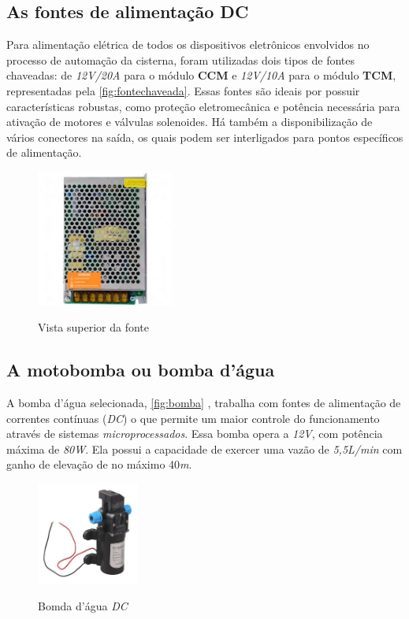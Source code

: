 \subsection{As fontes de alimentação DC}

Para alimentação elétrica de todos os dispositivos eletrônicos envolvidos no processo de automação da cisterna, foram utilizadas dois tipos de fontes chaveadas: de \textit{12V/20A} para o módulo \textbf{CCM} e \textit{12V/10A} para o módulo \textbf{TCM}, representadas pela \autoref{fig:fontechaveada}. Essas fontes são ideais por possuir características robustas, como proteção eletromecânica e potência necessária para ativação de motores e válvulas solenoides. Há também a disponibilização de vários conectores na saída, os quais podem ser interligados para pontos específicos de alimentação.

\begin{figure}[H]
	\centering
	\caption{Vista superior da fonte}
	\includegraphics[width=0.4\textwidth]{figuras/fonte_chaveada.jpg}
	\label{fig:fontechaveada}
\end{figure} 

\subsection{A motobomba ou bomba d'água}

A bomba d'água selecionada, \autoref{fig:bomba} , trabalha com fontes de alimentação de correntes contínuas (\textit{DC}) o que permite um maior controle do funcionamento através de sistemas \textit{microprocessados}. Essa bomba opera a \textit{12V}, com potência máxima de \textit{80W}. Ela possui a capacidade de exercer uma vazão de \textit{5,5L/min} com ganho de elevação de no máximo 40\textit{m}.

\begin{figure}[H]
	\centering
	\caption{Bomda d'água \textit{DC}}
	\includegraphics[width=0.3\textwidth]{figuras/bomba.jpeg}
	\label{fig:bomba}
\end{figure}

